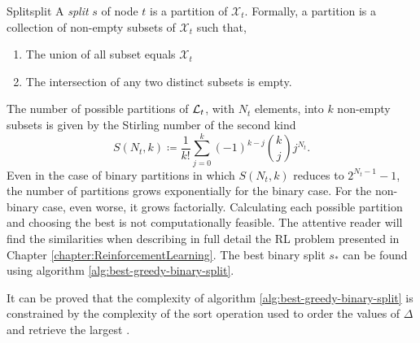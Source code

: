 \begin{dfn}{Split}{split}
    A \emph{split} $s$ of node $t$ is a partition of $\mathcal{X}_t$. Formally, a partition is a collection of non-empty subsets of $\mathcal{X}_t$ such that,
    \begin{enumerate}
        \item The union of all subset equals $\mathcal{X}_t$
        \item The intersection of any two distinct subsets is empty.
    \end{enumerate}
\end{dfn}

The number of possible partitions of $\mathcal{L}_t$, with $N_t$ elements, into $k$
non-empty subsets is given by the Stirling number of the second kind
\cite{louppe2014}
\[
    S(N_t, k) \coloneqq \frac{1}{k!} \sum_{j=0}^{k} (-1)^{k-j} \binom{k}{j} j^{N_t}.
\]
Even in the case of binary partitions in which $S(N_t, k)$ reduces to $2^{N_t
-1}-1$, the number of partitions grows exponentially for the binary case. For
the non-binary case, even worse, it grows factorially. Calculating each possible
partition and choosing the best is not computationally feasible. The attentive
reader will find the similarities when describing in full detail the RL problem
presented in Chapter \ref{chapter:ReinforcementLearning}. The best binary split
$s_*$ can be found using algorithm \ref{alg:best-greedy-binary-split}.

\begin{algorithm}
    \caption[Best binary, greedy, split for node $t$.]{Best binary greedy split $s_*$ for node $t$ \cite[Ch.~3.6.3]{louppe2014}.}
    \label{alg:best-greedy-binary-split}
\end{algorithm}

It can be proved that the complexity of algorithm
\ref{alg:best-greedy-binary-split} is constrained by the complexity of the sort
operation used to order the values of $\Delta$ and retrieve the largest
\cite[Ch.~5]{louppe2014}.

